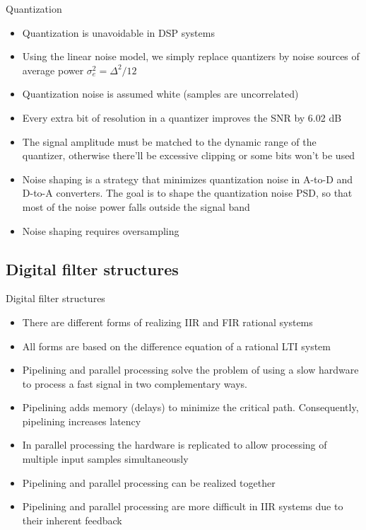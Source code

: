 \documentclass[10pt, aspectratio=169]{beamer}
\begin{document}
%
\begin{frame}{Quantization}
\begin{itemize}
	\item Quantization is unavoidable in DSP systems
	\item Using the linear noise model, we simply replace quantizers by noise sources of average power $\sigma_e^2 = \Delta^2/12$
	\item Quantization noise is assumed white (samples are uncorrelated)
	\item Every extra bit of resolution in a quantizer improves the SNR by 6.02 dB
	\item The signal amplitude must be matched to the dynamic range of the quantizer, otherwise there'll be excessive clipping or some bits won't be used
	\item Noise shaping is a strategy that minimizes quantization noise in A-to-D and D-to-A converters. The goal is to shape the quantization noise PSD, so that most of the noise power falls outside the signal band
	\item Noise shaping requires oversampling
\end{itemize}
\end{frame}

%
\subsection{Digital filter structures}
\begin{frame}{Digital filter structures}
\begin{itemize}
	\item There are different forms of realizing IIR and FIR rational systems
	\item All forms are based on the difference equation of a rational LTI system
	\item Pipelining and parallel processing solve the problem of using a slow hardware to process a fast signal in two complementary ways. 
	\item Pipelining adds memory (delays) to minimize the critical path. Consequently, pipelining increases latency
	\item In parallel processing the hardware is replicated to allow processing of multiple input samples simultaneously
	\item Pipelining and parallel processing can be realized together
	\item Pipelining and parallel processing are more difficult in IIR systems due to their inherent feedback
\end{itemize}
\end{frame}
\end{document}
